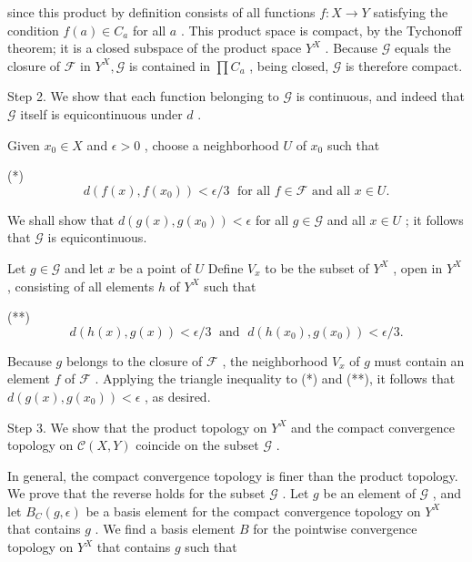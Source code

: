\documentclass[10pt]{article}
\begin{document}
since this product by definition consists of all functions \(f : X \rightarrow  Y\) satisfying the condition \(f\left( a\right)  \in  {C}_{a}\) for all \(a\) . This product space is compact, by the Tychonoff theorem; it is a closed subspace of the product space \({Y}^{X}\) . Because \(\mathcal{G}\) equals the closure of \(\mathcal{F}\) in \({Y}^{X},\mathcal{G}\) is contained in \(\prod {C}_{a}\) , being closed, \(\mathcal{G}\) is therefore compact.

Step 2. We show that each function belonging to \(\mathcal{G}\) is continuous, and indeed that \(\mathcal{G}\) itself is equicontinuous under \(d\) .

Given \({x}_{0} \in  X\) and \(\epsilon  > 0\) , choose a neighborhood \(U\) of \({x}_{0}\) such that

(*)
\[
d\left( {f\left( x\right) ,f\left( {x}_{0}\right) }\right)  < \epsilon /3\;\text{ for all }f \in  \mathcal{F}\text{ and all }x \in  U.
\]

We shall show that \(d\left( {g\left( x\right) ,g\left( {x}_{0}\right) }\right)  < \epsilon\) for all \(g \in  \mathcal{G}\) and all \(x \in  U\) ; it follows that \(\mathcal{G}\) is equicontinuous.

Let \(g \in  \mathcal{G}\) and let \(x\) be a point of \(U\) Define \({V}_{x}\) to be the subset of \({Y}^{X}\) , open in \({Y}^{X}\) , consisting of all elements \(h\) of \({Y}^{X}\) such that

(**)
\[
d\left( {h\left( x\right) ,g\left( x\right) }\right)  < \epsilon /3\;\text{ and }\;d\left( {h\left( {x}_{0}\right) ,g\left( {x}_{0}\right) }\right)  < \epsilon /3.
\]

Because \(g\) belongs to the closure of \(\mathcal{F}\) , the neighborhood \({V}_{x}\) of \(g\) must contain an element \(f\) of \(\mathcal{F}\) . Applying the triangle inequality to (*) and (**), it follows that \(d\left( {g\left( x\right) ,g\left( {x}_{0}\right) }\right)  < \epsilon\) , as desired.

Step 3. We show that the product topology on \({Y}^{X}\) and the compact convergence topology on \(\mathcal{C}\left( {X,Y}\right)\) coincide on the subset \(\mathcal{G}\) .

In general, the compact convergence topology is finer than the product topology. We prove that the reverse holds for the subset \(\mathcal{G}\) . Let \(g\) be an element of \(\mathcal{G}\) , and let \({B}_{C}\left( {g,\epsilon }\right)\) be a basis element for the compact convergence topology on \({Y}^{X}\) that contains \(g\) . We find a basis element \(B\) for the pointwise convergence topology on \({Y}^{X}\) that contains \(g\) such that
\end{document}
